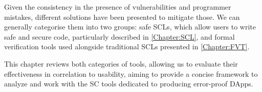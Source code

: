 \documentclass[oneside]{ecsproject}     %
\newcommand{\lref}[1]{Listing~\ref{#1}}
\begin{document}
Given the consistency in the presence of vulnerabilities and programmer mistakes, different solutions have been presented to mitigate those. 
We can generally categorise them into two groups: safe SCLs, which allow users to write safe and secure code, particularly described in \cref{Chapter:SCL}, 
and formal verification tools used alongside traditional SCLs presented in \cref{Chapter:FVT}.

This chapter reviews both categories of tools, allowing us to evaluate their effectiveness in correlation to usability,
aiming to provide a concise framework to analyze and work with the SC tools dedicated to producing
error-proof DApps. 




\end{document}
